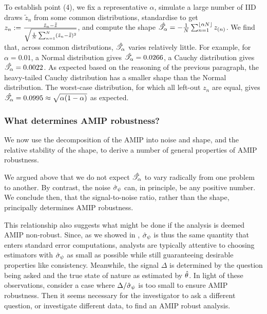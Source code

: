 To establish point (4), we fix a representative $\alpha$, simulate a large
number of IID draws $\tilde{z}_n$ from some common distributions, standardise to
get $z_n := \frac{\tilde{z}_{n} - \bar{\tilde{z}}}{\sqrt{\frac{1}{N}\sum_{n=1}^N (\tilde{z}_n -
\bar{\tilde{z}})^2}}$, and compute the shape $\hat{\mathscr{T}}_\alpha = -\frac{1}{N}
\sum_{n=1}^{\lfloor \alpha N \rfloor} z_{(n)}$. We find that, across common
distributions, $\hat{\mathscr{T}}_\alpha$ varies relatively little. For example, for $\alpha =
0.01$, a Normal distribution gives $\hat{\mathscr{T}}_\alpha = 0.0266$, a Cauchy distribution
gives $\hat{\mathscr{T}}_\alpha = 0.0022$.  As expected based on the reasoning of the previous
paragraph, the heavy-tailed Cauchy distribution has a smaller shape than the
Normal distribution.  The worst-case distribution, for which all left-out $z_n$
are equal, gives $\hat{\mathscr{T}}_\alpha = 0.0995 \approx \sqrt{\alpha(1-\alpha)}$ as expected.





\subsubsection{What determines AMIP robustness?}
We now use the decomposition of the AMIP into noise and shape, and the relative
stability of the shape, to derive a number of general properties of AMIP
robustness.

%
We argued above that we do not expect $\hat{\mathscr{T}}_\alpha$ to vary radically from
one problem to another. By contrast, the noise $\hat{\sigma}_{\psi}$ can, in principle,
be any positive number.  We conclude then, that the signal-to-noise ratio,
rather than the shape, principally determines AMIP robustness.

This relationship also suggests what might be done if the analysis is deemed
AMIP non-robust. Since, as we showed in ,
$\hat{\sigma}_{\psi}$ is thus the same quantity that enters standard error computations,
analysts are typically attentive to choosing estimators with $\hat{\sigma}_{\psi}$ as
small as possible while still guaranteeing desirable properties like
consistency. Meanwhile, the signal $\Delta$ is determined by the question being
asked and the true state of nature as estimated by $\hat{\theta}$.  In light of
these observations, consider a case where $\Delta / \hat{\sigma}_{\psi}$ is too small to
ensure AMIP robustness. Then it seems necessary for the investigator to ask a
different question, or investigate different data, to find an AMIP robust
analysis.


